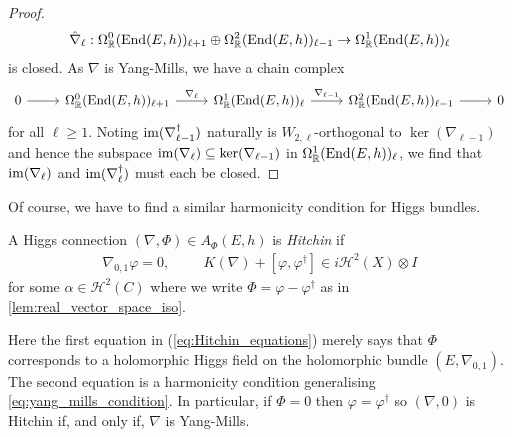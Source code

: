 \documentclass[12pt]{ociamthesis}  %
\begin{document}
\begin{lemma}
\begin{proof}
\begin{align*}
      \hat\nabla_\ell :
      \Omega^0_{\mathbb R}(\operatorname{End}(E,h))_{\ell+1}
      \oplus \Omega^2_{\mathbb R}(\operatorname{End}(E,h))_{\ell-1}
      \to \Omega^1_{\mathbb R}(\operatorname{End}(E,h))_\ell
    \end{align*}
    is closed. As $\nabla$ is Yang-Mills, we have a chain complex
    \begin{equation*}
      \begin{tikzcd}
        0 & {\Omega^0_{\mathbb R}(\End(E,h))_{\ell+1}} & {\Omega^1_{\mathbb R}(\End(E,h))_\ell} & {\Omega^2_{\mathbb R}(\End(E,h))_{\ell-1}} & 0
        \arrow[from=1-1, to=1-2]
        \arrow["{\nabla_\ell}", from=1-2, to=1-3]
        \arrow["{\nabla_{\ell-1}}", from=1-3, to=1-4]
        \arrow[from=1-4, to=1-5]
      \end{tikzcd}
    \end{equation*}
    for all $\ell\geq 1$.  Noting $\operatorname{im}(\nabla_{\ell-1}^\dagger)$
    naturally is $W_{2,\ell}$-orthogonal to $\ker(\nabla_{\ell-1})$
    and hence the subspace $\operatorname{im}(\nabla_{\ell})\subseteq\ker(\nabla_{\ell-1})$
    in $\Omega^1_{\mathbb R}(\operatorname{End}(E,h))_\ell$, we find that
    $\operatorname{im}(\nabla_\ell)$ and $\operatorname{im}(\nabla_\ell^\dagger)$ must each be
    closed.
  \end{proof}
\end{lemma}

Of course, we have to find a similar harmonicity condition for
Higgs bundles.

\begin{definition}
  A Higgs connection $(\nabla,\Phi)\in A_\Phi(E,h)$
  is \emph{Hitchin} if
  \begin{align}\label{eq:Hitchin_equations}
    \nabla_{0,1}\varphi = 0,\hspace{1cm}
    K(\nabla) + [\varphi,\varphi^\dagger] \in i\mathcal H^2(X)\otimes I
  \end{align}
  for some $\alpha\in\mathcal H^2(C)$ where we write
  $\Phi = \varphi - \varphi^\dagger$ as in \ref{lem:real_vector_space_iso}.
\end{definition}

Here the first equation in (\ref{eq:Hitchin_equations}) merely says that $\Phi$
corresponds to a holomorphic Higgs field on the holomorphic bundle
$(E,\nabla_{0,1})$.  The second equation is a harmonicity condition generalising
\ref{eq:yang_mills_condition}. In particular, if $\Phi = 0$ then $\varphi =
  \varphi^\dagger$ so $(\nabla,0)$ is Hitchin if, and only if, $\nabla$ is
Yang-Mills.
\end{document}
